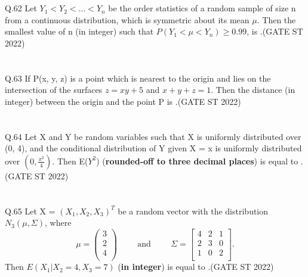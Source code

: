 \documentclass[journal,12pt,onecolumn]{IEEEtran}
\theoremstyle{remark}
\begin{document}
\\
\\
Q.62 Let $Y_1 < Y_2 < \dots < Y_n$ be the order statistics of a random sample of size n from a continuous distribution, which is symmetric about its mean $\mu$. Then the smallest value of n (in integer) such that $P(Y_1 < \mu < Y_n) \geq 0.99$, is \underline{\hspace{2cm}}.\hfill (GATE ST 2022)\\
\\
\\
Q.63 If P(x, y, z) is a point which is nearest to the origin and lies on the intersection of the surfaces $z = xy + 5$ and $x + y + z = 1$. Then the distance (in integer) between the origin and the point P is \underline{\hspace{2cm}}.\hfill (GATE ST 2022)\\
\\
\\
Q.64 Let X and Y be random variables such that X is uniformly distributed over (0, 4), and the conditional distribution of Y given X = x is uniformly distributed over $(0, \frac{x^2}{4})$. Then E($Y^2$) (\textbf{rounded-off to three decimal places}) is equal to \underline{\hspace{2cm}}.\hfill (GATE ST 2022)\\
\\
\\
Q.65 Let X = $(X_1, X_2, X_3)^T$ be a random vector with the distribution $N_3(\mu, \Sigma)$, where 
\[
\mu = \begin{pmatrix}
	3 \\
	2 \\
	4\\
\end{pmatrix}
\hspace{1cm} \text{and} \hspace{1cm} \Sigma = \begin{bmatrix}
	4 & 2 & 1 \\
	2 & 3 & 0 \\
	1 & 0 & 2 \\
\end{bmatrix}.
\]
Then $E(X_1|X_2 = 4, X_3 = 7)$ (\textbf{in integer}) is equal to \underline{\hspace{2cm}}.\hfill (GATE ST 2022)
	
\end{document}
